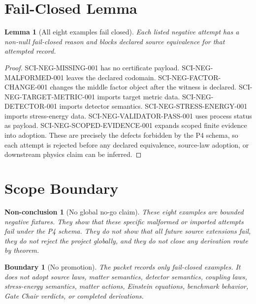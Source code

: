 \documentclass[11pt]{article}
\newtheorem{lemma}{Lemma}
\newtheorem{boundary}{Boundary}
\newtheorem{nonconclusion}{Non-conclusion}
\begin{document}
\section{Fail-Closed Lemma}

\begin{lemma}[All eight examples fail closed]
Each listed negative attempt has a non-null fail-closed reason and blocks
declared source equivalence for that attempted record.
\end{lemma}

\begin{proof}
SCI-NEG-MISSING-001 has no certificate payload. SCI-NEG-MALFORMED-001 leaves
the declared codomain. SCI-NEG-FACTOR-CHANGE-001 changes the middle factor
object after the witness is declared. SCI-NEG-TARGET-METRIC-001 imports target
metric data. SCI-NEG-DETECTOR-001 imports detector semantics.
SCI-NEG-STRESS-ENERGY-001 imports stress-energy data. SCI-NEG-VALIDATOR-PASS-001
uses process status as payload. SCI-NEG-SCOPED-EVIDENCE-001 expands scoped
finite evidence into adoption. These are precisely the defects forbidden by
the P4 schema, so each attempt is rejected before any declared equivalence,
source-law adoption, or downstream physics claim can be inferred.
\end{proof}

\section{Scope Boundary}

\begin{nonconclusion}[No global no-go claim]
These eight examples are bounded negative fixtures. They show that these
specific malformed or imported attempts fail under the P4 schema. They do not
show that all future source extensions fail, they do not reject the project
globally, and they do not close any derivation route by theorem.
\end{nonconclusion}

\begin{boundary}[No promotion]
The packet records only fail-closed examples. It does not adopt source laws,
matter semantics, detector semantics, coupling laws, stress-energy semantics,
matter actions, Einstein equations, benchmark behavior, Gate Chair verdicts,
or completed derivations.
\end{boundary}
\end{document}
